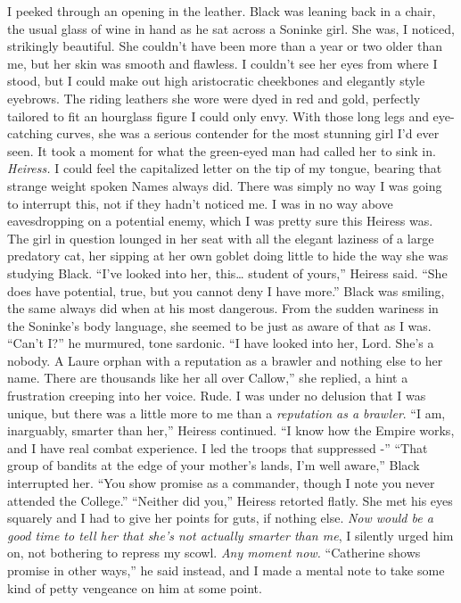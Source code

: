 \documentclass[12pt, openany]{book}
\begin{document}
I peeked through an opening in the leather. Black was leaning back in a chair, the usual glass of wine in hand as he sat across a Soninke girl. She was, I noticed, strikingly beautiful. She couldn’t have been more than a year or two older than me, but her skin was smooth and flawless. I couldn’t see her eyes from where I stood, but I could make out high aristocratic cheekbones and elegantly style eyebrows. The riding leathers she wore were dyed in red and gold, perfectly tailored to fit an hourglass figure I could only envy. With those long legs and eye-catching curves, she was a serious contender for the most stunning girl I’d ever seen. It took a moment for what the green-eyed man had called her to sink in. \textit{Heiress.} I could feel the capitalized letter on the tip of my tongue, bearing that strange weight spoken Names always did. There was simply no way I was going to interrupt this, not if they hadn’t noticed me. I was in no way above eavesdropping on a potential enemy, which I was pretty sure this Heiress was. The girl in question lounged in her seat with all the elegant laziness of a large predatory cat, her sipping at her own goblet doing little to hide the way she was studying Black.
“I’ve looked into her, this… student of yours,” Heiress said. “She does have potential, true, but you cannot deny I have more.”
Black was smiling, the same always did when at his most dangerous. From the sudden wariness in the Soninke’s body language, she seemed to be just as aware of that as I was.
“Can’t I?” he murmured, tone sardonic.
“I have looked into her, Lord. She’s a nobody. A Laure orphan with a reputation as a brawler and nothing else to her name. There are thousands like her all over Callow,” she replied, a hint a frustration creeping into her voice.
Rude. I was under no delusion that I was unique, but there was a little more to me than a \textit{reputation as a brawler}.
“I am, inarguably, smarter than her,” Heiress continued. “I know how the Empire works, and I have real combat experience. I led the troops that suppressed -”
“That group of bandits at the edge of your mother’s lands, I’m well aware,” Black interrupted her. “You show promise as a commander, though I note you never attended the College.”
“Neither did you,” Heiress retorted flatly.
She met his eyes squarely and I had to give her points for guts, if nothing else.\textit{ Now would be a good time to tell her that she’s not actually smarter than me}, I silently urged him on, not bothering to repress my scowl. \textit{Any moment now.}
“Catherine shows promise in other ways,” he said instead, and I made a mental note to take some kind of petty vengeance on him at some point.
\end{document}
